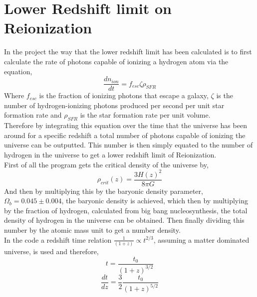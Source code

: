 \documentclass{article}
\begin{document}
\section{Lower Redshift limit on Reionization}
In the project the way that the lower redshift limit has been calculated is to first calculate the rate of photons capable of ionizing a hydrogen atom via the equation, \cite{2010Natur.468...49R}
\begin{equation}
\frac{dn_{ion}}{dt}=f_{esc}\zeta\rho_{SFR}  
\end{equation}
Where $f_{esc}$ is the fraction of ionizing photons that escape a galaxy, $\zeta$ is the number of hydrogen-ionizing photons produced per second per unit star formation rate and $\rho_{SFR}$ is the star formation rate per unit volume.\\
\indent Therefore by integrating this equation over the time that the universe has been around for a specific redshift a total number of photons capable of ionizing the universe can be outputted. This number is then simply equated to the number of hydrogen in the universe to get a lower redshift limit of Reionization.\\
First of all the program gets the critical density of the universe by,
\begin{equation}
\rho_{crit}(z)=\frac{3H(z)^{2}}{8\pi G}
\end{equation}
And then by multiplying this by the baryonic density parameter, $\Omega_{b}=0.045\pm0.004$, the baryonic density is achieved, which then by multiplying by the fraction of hydrogen, calculated from big bang nucleosynthesis, the total density of hydrogen in the universe can be obtained. Then finally dividing this number by the atomic mass unit to get a number density.\\

\indent In the code a redshift time relation $\frac{1}{(1+z)}\propto t^{2/3}$, assuming a matter dominated universe, is used and therefore,
\begin{equation}
t=\frac{t_{0}}{(1+z)^{3/2}}
\end{equation}
\begin{equation}
\frac{dt}{dz}=\frac{3}{2}\frac{t_{0}}{(1+z)^{5/2}}
\end{equation}
\end{document}
